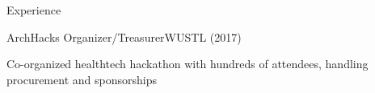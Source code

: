 \begin{rSection}{Experience}
    \begin{rSubsection}{ArchHacks Organizer/Treasurer}{WUSTL (2017)}{}{}
    \item Co-organized healthtech hackathon with hundreds of attendees, handling procurement and sponsorships
    \end{rSubsection}
  \end{rSection}


